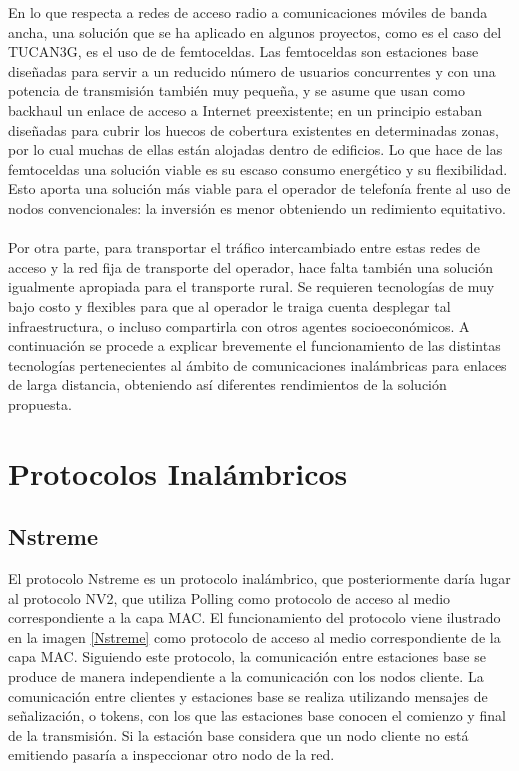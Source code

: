 	En lo que respecta a redes de acceso radio a comunicaciones móviles de banda ancha, una solución que se ha aplicado en algunos proyectos, como es el caso del TUCAN3G, es el uso de de femtoceldas. Las femtoceldas son estaciones base diseñadas para servir a un reducido número de usuarios concurrentes y con una potencia de transmisión también muy pequeña, y se asume que usan como backhaul un enlace de acceso a Internet preexistente; en un principio estaban diseñadas para cubrir los huecos de cobertura existentes en determinadas zonas, por lo cual muchas de ellas están alojadas dentro de edificios. Lo que hace de las femtoceldas una solución viable es su escaso consumo energético y su flexibilidad. Esto aporta una solución más viable para el operador de telefonía frente al uso de nodos convencionales: la inversión es menor obteniendo un redimiento equitativo.\\\\
	
	Por otra parte, para transportar el tráfico intercambiado entre estas redes de acceso y la red fija de transporte del operador, hace falta también una solución igualmente apropiada para el transporte rural. Se requieren tecnologías de muy bajo costo y flexibles para que al operador le traiga cuenta desplegar tal infraestructura, o incluso compartirla con otros agentes socioeconómicos. A continuación se procede a explicar brevemente el funcionamiento de las distintas tecnologías pertenecientes al ámbito de comunicaciones inalámbricas para enlaces de larga distancia, obteniendo así diferentes rendimientos de la solución propuesta.


\section{Protocolos Inalámbricos}

		\subsection{Nstreme}
		El protocolo Nstreme es un protocolo inalámbrico, que posteriormente daría lugar al protocolo NV2, que utiliza Polling como protocolo de acceso al medio correspondiente a la capa MAC. El funcionamiento del protocolo viene ilustrado en la imagen \ref{Nstreme} como protocolo de acceso al medio correspondiente de la capa MAC. Siguiendo este protocolo, la comunicación entre estaciones base se produce de manera independiente a la comunicación con los nodos cliente. La comunicación entre clientes y estaciones base se realiza utilizando mensajes de señalización, o tokens, con los que las estaciones base conocen el comienzo y final de la transmisión. Si la estación base considera que un nodo cliente no está emitiendo pasaría a inspeccionar otro nodo de la red.    
	
